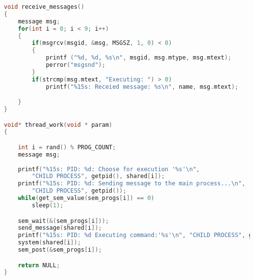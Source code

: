 \documentclass{article}
\begin{document}
\begin{lstlisting}[language=C++]
void receive_messages()
{
    message msg;
    for(int i = 0; i < 9; i++)
    {
        if(msgrcv(msgid, &msg, MSGSZ, 1, 0) < 0)
        {
            printf ("%d, %d, %s\n", msgid, msg.mtype, msg.mtext);
            perror("msgsnd");
        }
        if(strcmp(msg.mtext, "Executing: ") > 0)
            printf("%15s: Receied message: %s\n", name, msg.mtext);

    }
}

void* thread_work(void * param)
{

    int i = rand() % PROG_COUNT;
    message msg;
    
    printf("%15s: PID: %d: Choose for execution '%s'\n",
        "CHILD PROCESS", getpid(), shared[i]);
    printf("%15s: PID: %d: Sending message to the main process...\n", 
        "CHILD PROCESS", getpid());
    while(get_sem_value(sem_progs[i]) == 0)
        sleep(1);

    sem_wait(&(sem_progs[i]));
    send_message(shared[i]);
    printf("%15s: PID: %d Executing command:'%s'\n", "CHILD PROCESS", getpid(), shared[i]);
    system(shared[i]);
    sem_post(&sem_progs[i]);

    return NULL;
}
\end{lstlisting}
\end{document}
